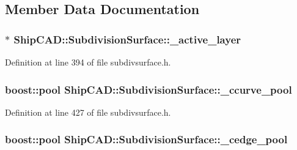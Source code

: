 \subsection{Member Data Documentation}
\hypertarget{classShipCAD_1_1SubdivisionSurface_aef766e0b62189247c0f3214c56800040}{
\subsubsection[{\-\_\-active\-\_\-layer}]{$\ast$ Ship\-C\-A\-D\-::\-Subdivision\-Surface\-::\-\_\-active\-\_\-layer\hspace{0.3cm}{\ttfamily [protected]}}}\label{classShipCAD_1_1SubdivisionSurface_aef766e0b62189247c0f3214c56800040}


Definition at line 394 of file subdivsurface.\-h.

\hypertarget{classShipCAD_1_1SubdivisionSurface_ae20f94c83bac02bae90a905379765b0a}{
\subsubsection[{\-\_\-ccurve\-\_\-pool}]{\setlength{\rightskip}{0pt plus 5cm}boost\-::pool Ship\-C\-A\-D\-::\-Subdivision\-Surface\-::\-\_\-ccurve\-\_\-pool\hspace{0.3cm}{\ttfamily [protected]}}}\label{classShipCAD_1_1SubdivisionSurface_ae20f94c83bac02bae90a905379765b0a}


Definition at line 427 of file subdivsurface.\-h.

\hypertarget{classShipCAD_1_1SubdivisionSurface_a413da68890d958a7994d09e0906be102}{
\subsubsection[{\-\_\-cedge\-\_\-pool}]{\setlength{\rightskip}{0pt plus 5cm}boost\-::pool Ship\-C\-A\-D\-::\-Subdivision\-Surface\-::\-\_\-cedge\-\_\-pool\hspace{0.3cm}{\ttfamily [protected]}}}\label{classShipCAD_1_1SubdivisionSurface_a413da68890d958a7994d09e0906be102}


